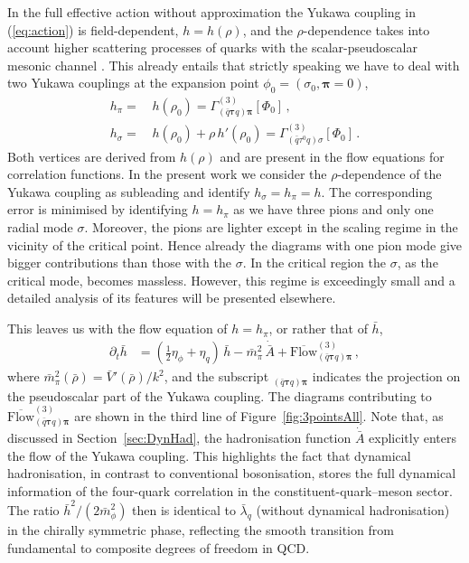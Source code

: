 \documentclass[%
reprint,
superscriptaddress,
showpacs,preprintnumbers,
 amsmath,amssymb,
 aps,
prd,
]{revtex4-1}
\def\Fig#1{Figure~\ref{#1}}
\def\eq#1{(\ref{#1})}
\def\sec#1{Section~\ref{#1}}
\begin{document}
In the full effective action without approximation the Yukawa coupling
in \eq{eq:action} is field-dependent, $h=h(\rho)$, and the
$\rho$-dependence takes into account higher scattering processes of
quarks with the scalar-pseudoscalar mesonic channel
\cite{Pawlowski:2014zaa}. This already entails that strictly speaking
we have to deal with two Yukawa couplings at the expansion point
\mbox{$\phi_0=(\sigma_0,\bm\pi=0)$},
%
\begin{align}\nonumber 
  h_\pi =
  &\, h(\rho_0) =\Gamma^{(3)}_{(\bar q \bm \tau q) \bm\pi}[
    \Phi_0]\,,\\[1ex] 
  h_\sigma =
  &\, h(\rho_0) + \rho\, h'(\rho_0)=
    \Gamma^{(3)}_{(\bar q \tau^0 q) \sigma}[\Phi_0]\,.
\label{eq:2Yuks}\end{align}
%
Both vertices are derived from $h(\rho)$ and are present in the flow
equations for correlation functions. In the present work we consider
the $\rho$-dependence of the Yukawa coupling as subleading and
identify $ h_\sigma = h_\pi=h$. The corresponding error is minimised
by identifying $h=h_\pi$ as we have three pions and only one radial
mode $\sigma$. Moreover, the pions are lighter except in the scaling
regime in the vicinity of the critical point. Hence already the
diagrams with one pion mode give bigger contributions than those with
the $\sigma$. In the critical region the $\sigma$, as the critical
mode, becomes massless. However, this regime is exceedingly small and
a detailed analysis of its features will be presented elsewhere.


This leaves us with the flow equation of $h=h_\pi$, or rather that of
$\bar h$,
%
\begin{align}
  \partial_t \bar{h}
  &=\left( \frac12 \eta_{\phi}+\eta_{q}\right)\,\bar{h}-
    \bar m^2_\pi\,\dot{\bar{A}}+
    \overline{\textrm{Flow}}^{(3)}_{  (\bar q \bm\tau q) \bm\pi}\,,
                      \label{eq:hpiflow}
\end{align}
%
where $\bar m^2_\pi(\bar \rho)= \bar V'(\bar \rho)/k^2$, and the
subscript ${}_{(\bar q \bm\tau q) \bm\pi}$ indicates the projection on
the pseudoscalar part of the Yukawa coupling. The diagrams
contributing to
$\overline{\textrm{Flow}}^{(3)}_{ (\bar q \bm\tau q) \bm\pi}$ are
shown in the third line of \Fig{fig:3pointsAll}. Note that, as
discussed in \sec{sec:DynHad}, the hadronisation function
$\dot{\bar{A}}$ explicitly enters the flow of the Yukawa
coupling. This highlights the fact that dynamical hadronisation, in
contrast to conventional bosonisation, stores the full dynamical
information of the four-quark correlation in the
constituent-quark--meson sector. The ratio $\bar h^2/(2\bar m_\phi^2)$
then is identical to $\bar\lambda_q$ (without dynamical hadronisation)
in the chirally symmetric phase, reflecting the smooth transition from
fundamental to composite degrees of freedom in QCD.
\end{document}
